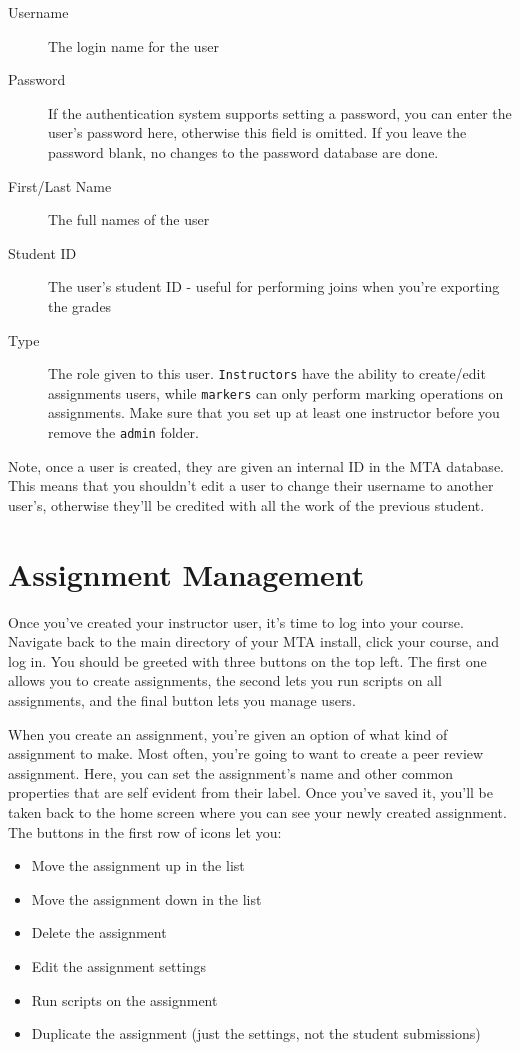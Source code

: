 \documentclass[11pt,letterpaper,oneside]{article}
\begin{document}
\begin{description}
  \item [Username] The login name for the user
  \item [Password] If the authentication system supports setting a password,  you can enter the user's password here,  otherwise this field is omitted. If you leave the password blank,  no changes to the password database are done.
  \item [First/Last Name] The full names of the user
  \item [Student ID] The user's student ID - useful for performing joins when you're exporting the grades
  \item [Type] The role given to this user. \texttt{Instructors} have the ability to create/edit assignments users,  while \texttt{markers} can only perform marking operations on assignments. Make sure that you set up at least one instructor before you remove the \texttt{admin} folder.
\end{description}

Note, once a user is created,  they are given an internal ID in the MTA database. This means that you shouldn't edit a user to change their username to another user's,  otherwise they'll be credited with all the work of the previous student. 

\section{Assignment Management}

Once you've created your instructor user,  it's time to log into your course. Navigate back to the main directory of your MTA install,  click your course,  and log in. You should be greeted with three buttons on the top left. The first one allows you to create assignments,  the second lets you run scripts on all assignments,  and the final button lets you manage users. 

When you create an assignment,  you're given an option of what kind of assignment to make. Most often,  you're going to want to create a peer review assignment. Here,  you can set the assignment's name and other common properties that are self evident from their label. Once you've saved it,  you'll be taken back to the home screen where you can see your newly created assignment. The buttons in the first row of icons let you:
\begin{itemize}
  \item Move the assignment up in the list
  \item Move the assignment down in the list
  \item Delete the assignment
  \item Edit the assignment settings
  \item Run scripts on the assignment
  \item Duplicate the assignment (just the settings,  not the student submissions)
\end{itemize}
\end{document}
